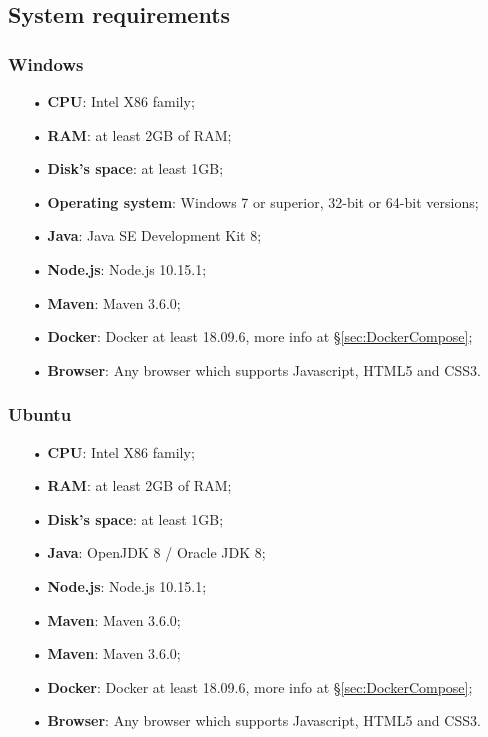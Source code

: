 \subsection{System requirements}
\subsubsection{Windows}
\begin{itemize}
\item [•]\textbf{CPU}: Intel X86 family;
\item [•]\textbf{RAM}: at least 2GB of RAM;
\item [•]\textbf{Disk's space}: at least 1GB;
\item [•]\textbf{Operating system}: Windows 7 or superior, 32-bit or 64-bit versions;
\item [•]\textbf{Java}: Java SE Development Kit 8;
\item [•]\textbf{Node.js}: Node.js 10.15.1;
\item [•]\textbf{Maven}: Maven 3.6.0;
\item [•]\textbf{Docker}: Docker at least 18.09.6, more info at §\ref{sec:DockerCompose};  
\item [•]\textbf{Browser}: Any browser which supports Javascript, HTML5 and CSS3.

\end{itemize}

\subsubsection{Ubuntu}
\begin{itemize}
\item [•]\textbf{CPU}: Intel X86 family;
\item [•]\textbf{RAM}: at least 2GB of RAM;
\item [•]\textbf{Disk's space}: at least 1GB;
\item [•]\textbf{Java}: OpenJDK 8 / Oracle JDK 8;
\item [•]\textbf{Node.js}: Node.js 10.15.1;
\item [•]\textbf{Maven}: Maven 3.6.0;
\item [•]\textbf{Maven}: Maven 3.6.0;
\item [•]\textbf{Docker}: Docker at least 18.09.6, more info at §\ref{sec:DockerCompose};   
\item [•]\textbf{Browser}: Any browser which supports Javascript, HTML5 and CSS3.
\end{itemize}

